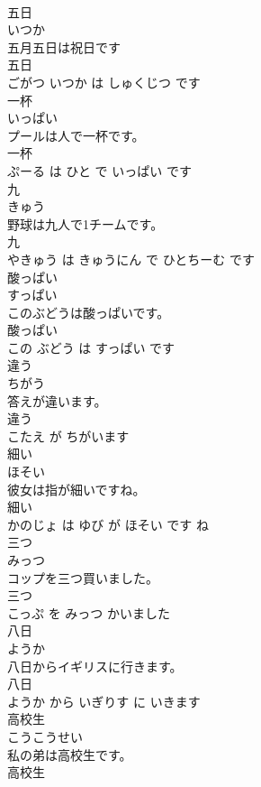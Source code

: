 \documentclass[8pt]{extreport}
\begin{document}
\begin{CJK}{UTF8}{min}
\\	五日	
\\	いつか			
\\	五月五日は祝日です	
\\	五日 
\\	ごがつ いつか は しゅくじつ です			
\\	一杯	
\\	いっぱい			
\\	プールは人で一杯です。	
\\	一杯 
\\	ぷーる は ひと で いっぱい です			
\\	九	
\\	きゅう			
\\	野球は九人で1チームです。	
\\	九 
\\	やきゅう は きゅうにん で ひとちーむ です			
\\	酸っぱい	
\\	すっぱい			
\\	このぶどうは酸っぱいです。	
\\	酸っぱい 
\\	この ぶどう は すっぱい です			
\\	違う	
\\	ちがう			
\\	答えが違います。	
\\	違う 
\\	こたえ が ちがいます			
\\	細い	
\\	ほそい			
\\	彼女は指が細いですね。	
\\	細い 
\\	かのじょ は ゆび が ほそい です ね			
\\	三つ	
\\	みっつ			
\\	コップを三つ買いました。	
\\	三つ 
\\	こっぷ を みっつ かいました			
\\	八日	
\\	ようか			
\\	八日からイギリスに行きます。	
\\	八日 
\\	ようか から いぎりす に いきます			
\\	高校生	
\\	こうこうせい			
\\	私の弟は高校生です。	
\\	高校生 

\end{CJK}
\end{document}
